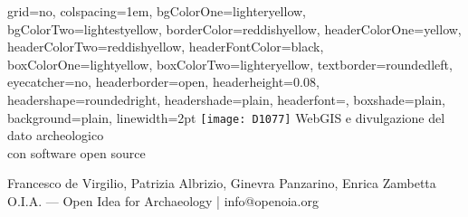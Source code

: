 \documentclass[svgnames,portrait,final,usenames,dvipsnames]{baposter}
\begin{document}
\newlength{\leftimgwidth}
\begin{poster}%
    {%
        grid=no,                    %
        colspacing=1em,             %
        bgColorOne=lighteryellow,   %
        bgColorTwo=lightestyellow,
        borderColor=reddishyellow,
        headerColorOne=yellow,
        headerColorTwo=reddishyellow,
        headerFontColor=black,
        boxColorOne=lightyellow,
        boxColorTwo=lighteryellow,
        textborder=roundedleft,     %
        eyecatcher=no,              %
        headerborder=open,
        headerheight=0.08\textheight,
        headershape=roundedright,
        headershade=plain,
        headerfont=\Large\textsf,   %
        boxshade=plain,
        background=plain,           %
        linewidth=2pt
    }
    {\texttt{[image: D1077]}} 
    {\sf \LARGE %
        WebGIS e divulgazione del dato archeologico\\
        con software open source
    }
    {\sf \large%
    \vspace{1em}Francesco de Virgilio, Patrizia Albrizio, Ginevra Panzarino, Enrica Zambetta \\
    \small{O.I.A. --- Open Idea for Archaeology | info@openoia.org}

    }
    {%
    }


\end{poster}
\end{document}

